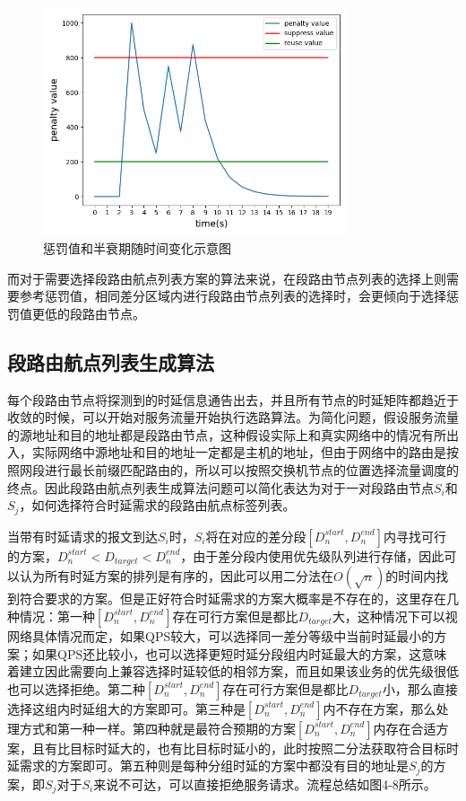 \begin{figure}[htbp]
\setlength{\abovecaptionskip}{15pt plus 3pt minus 2pt}
\centerline{\includegraphics[width=0.8\textwidth]{./figures/ch4-penalty-value.png}}
\caption{惩罚值和半衰期随时间变化示意图}
\label{fig-ch4-penalty-value}
\end{figure}

而对于需要选择段路由航点列表方案的算法来说，在段路由节点列表的选择上则需要参考惩罚值，相同差分区域内进行段路由节点列表的选择时，会更倾向于选择惩罚值更低的段路由节点。

\subsection{段路由航点列表生成算法}

每个段路由节点将探测到的时延信息通告出去，并且所有节点的时延矩阵都趋近于收敛的时候，可以开始对服务流量开始执行选路算法。为简化问题，假设服务流量的源地址和目的地址都是段路由节点，这种假设实际上和真实网络中的情况有所出入，实际网络中源地址和目的地址一定都是主机的地址，但由于网络中的路由是按照网段进行最长前缀匹配路由的，所以可以按照交换机节点的位置选择流量调度的终点。因此段路由航点列表生成算法问题可以简化表达为对于一对段路由节点$S_i$和$S_j$，如何选择符合时延需求的段路由航点标签列表。

当带有时延请求的报文到达$S_i$时，$S_i$将在对应的差分段$[D_n^{start},D_n^{end}]$内寻找可行的方案，$D_n^{start}{<D}_{target}<D_n^{end}$，由于差分段内使用优先级队列进行存储，因此可以认为所有时延方案的排列是有序的，因此可以用二分法在$O\left(\sqrt n\right)$的时间内找到符合要求的方案。但是正好符合时延需求的方案大概率是不存在的，这里存在几种情况：第一种$[D_n^{start},D_n^{end}]$存在可行方案但是都比$D_{target}$大，这种情况下可以视网络具体情况而定，如果QPS较大，可以选择同一差分等级中当前时延最小的方案；如果QPS还比较小，也可以选择更短时延分段组内时延最大的方案，这意味着建立因此需要向上兼容选择时延较低的相邻方案，而且如果该业务的优先级很低也可以选择拒绝。第二种$[D_n^{start},D_n^{end}]$存在可行方案但是都比$D_{target}$小，那么直接选择这组内时延组大的方案即可。第三种是$\left[D_n^{start},D_n^{end}\right]$内不存在方案，那么处理方式和第一种一样。第四种就是最符合预期的方案$\left[D_n^{start},D_n^{end}\right]$内存在合适方案，且有比目标时延大的，也有比目标时延小的，此时按照二分法获取符合目标时延需求的方案即可。第五种则是每种分组时延的方案中都没有目的地址是$S_j$的方案，即$S_j$对于$S_i$来说不可达，可以直接拒绝服务请求。流程总结如图4-8所示。

